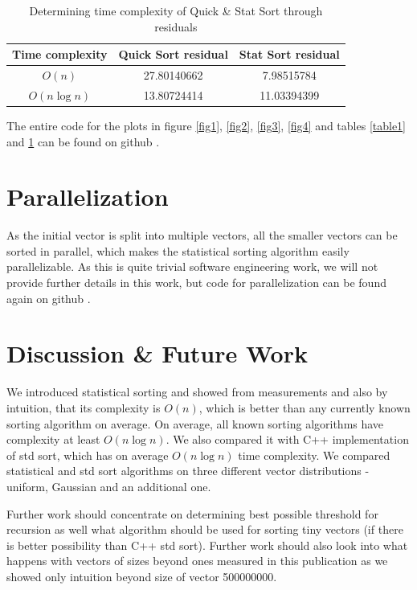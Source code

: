 \documentclass[12pt]{article}
\begin{document}
		\begin{table}
		\caption{Determining time complexity of Quick \& Stat Sort through residuals}
		\begin{center}
		\begin{tabular}{ |c|c|c| }
		\hline
		
		Time complexity & Quick Sort residual & Stat Sort residual \\

		\hline\hline		
		
		$O(n)$ &		27.80140662 &  7.98515784  \\
		$O(n \log n)$ & 13.80724414		& 11.03394399 \\

		\hline
		\end{tabular}
		\end{center}
		\label{table2}
		\end{table}

		
		The entire code for the plots in figure \ref{fig1}, \ref{fig2}, \ref{fig3}, \ref{fig4} and tables \ref{table1} and \ref{table2} can be found on github \cite{peta78}.
		
	\section{Parallelization}
	
	As the initial vector is split into multiple vectors, all the smaller vectors can be sorted in parallel, which makes the statistical sorting algorithm easily parallelizable. As this is quite trivial software engineering work, we will not provide further details in this work, but code for parallelization can be found again on github \cite{peta78b}.

	\section{Discussion \& Future Work}
	
	We introduced statistical sorting and showed from measurements and also by intuition, that its complexity is $O(n)$, which is better than any currently known sorting algorithm on average. On average, all known sorting algorithms have complexity at least $O( n \log n)$. We also compared it with C++ implementation of std sort, which has on average $O(n \log n)$ time complexity. We compared statistical and std sort algorithms on three different vector distributions - uniform, Gaussian and an additional one.
	
	Further work should concentrate on determining best possible threshold for recursion as well what algorithm should be used for sorting tiny vectors (if there is better possibility than C++ std sort). Further work should also look into what happens with vectors of sizes beyond ones measured in this publication as we showed only intuition beyond size of vector 500000000.
	
\end{document}
